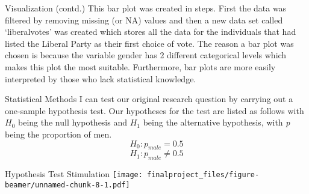 \documentclass[
  9pt,
  ignorenonframetext,
]{beamer}
\begin{document}
\begin{frame}
\begin{block}{Visualization (contd.)}
\protect\hypertarget{visualization-contd.}{}
This bar plot was created in steps. First the data was filtered by
removing missing (or NA) values and then a new data set called
`liberalvotes' was created which stores all the data for the individuals
that had listed the Liberal Party as their first choice of vote. The
reason a bar plot was chosen is because the variable gender has 2
different categorical levels which makes this plot the most suitable.
Furthermore, bar plots are more easily interpreted by those who lack
statistical knowledge.
\end{block}

\begin{block}{Statistical Methods}
\protect\hypertarget{statistical-methods-1}{}
I can test our original research question by carrying out a one-sample
hypothesis test. Our hypotheses for the test are listed as follows with
\(H_0\) being the null hypothesis and \(H_1\) being the alternative
hypothesis, with \emph{p} being the proportion of men.
\[H_0: p_{male}=0.5\] \[H_1: p_{male} \neq 0.5\]
\end{block}
\end{frame}

\begin{frame}
\begin{block}{Hypothesis Test Stimulation}
\protect\hypertarget{hypothesis-test-stimulation}{}
\texttt{[image: finalproject\_files/figure-beamer/unnamed-chunk-8-1.pdf]}
\end{block}
\end{frame}
\end{document}
